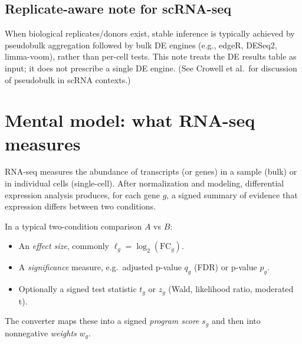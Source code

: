 \documentclass[11pt]{article}
\begin{document}
\subsection*{Replicate-aware note for scRNA-seq}
When biological replicates/donors exist, stable inference is typically achieved by pseudobulk aggregation followed by bulk DE engines (e.g., edgeR, DESeq2, limma-voom), rather than per-cell tests. This note treats the DE results table as input; it does not prescribe a single DE engine. (See Crowell et al.\ for discussion of pseudobulk in scRNA contexts.) \cite{crowell2020muscat}

\section{Mental model: what RNA-seq measures}
RNA-seq measures the abundance of transcripts (or genes) in a sample (bulk) or in individual cells (single-cell).
After normalization and modeling, differential expression analysis produces, for each gene $g$, a signed summary of evidence that expression differs between two conditions.

In a typical two-condition comparison $A$ vs $B$:
\begin{itemize}[leftmargin=2em]
\item An \emph{effect size}, commonly $\ell_g = \log_2(\mathrm{FC}_g)$.
\item A \emph{significance} measure, e.g.\ adjusted p-value $q_g$ (FDR) or p-value $p_g$.
\item Optionally a signed test statistic $t_g$ or $z_g$ (Wald, likelihood ratio, moderated t).
\end{itemize}

The converter maps these into a signed \emph{program score} $s_g$ and then into nonnegative \emph{weights} $w_g$.
\end{document}
